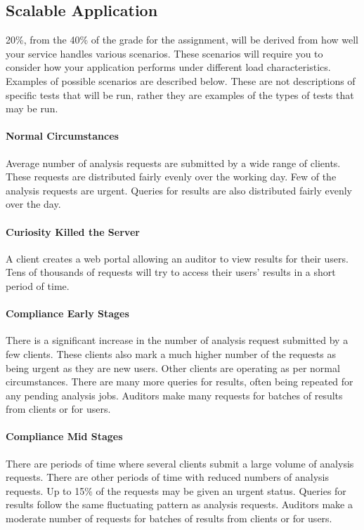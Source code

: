 \documentclass{csse4400}
\begin{document}
\subsection{Scalable Application}\label{sec:scenarios} %
20\%, from the 40\% of the grade for the assignment, will be derived from how well your service handles various scenarios.
These scenarios will require you to consider how your application performs under different load characteristics.
Examples of possible scenarios are described below.
These are not descriptions of specific tests that will be run,
rather they are examples of the types of tests that may be run.

\paragraph{Normal Circumstances}
Average number of analysis requests are submitted by a wide range of clients.
These requests are distributed fairly evenly over the working day.
Few of the analysis requests are urgent.
Queries for results are also distributed fairly evenly over the day.

\paragraph{Curiosity Killed the Server}
A client creates a web portal allowing an auditor to view results for their users.
Tens of thousands of requests will try to access their users' results in a short period of time.

\paragraph{Compliance Early Stages}
There is a significant increase in the number of analysis request submitted by a few clients.
These clients also mark a much higher number of the requests as being urgent as they are new users.
Other clients are operating as per normal circumstances.
There are many more queries for results, often being repeated for any pending analysis jobs.
Auditors make many requests for batches of results from clients or for users.

\paragraph{Compliance Mid Stages}
There are periods of time where several clients submit a large volume of analysis requests.
There are other periods of time with reduced numbers of analysis requests.
Up to 15\% of the requests may be given an urgent status.
Queries for results follow the same fluctuating pattern as analysis requests.
Auditors make a moderate number of requests for batches of results from clients or for users.
\end{document}

